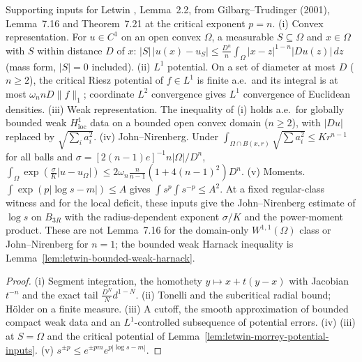 \begin{lemma}
  \label{lem:letwin-bounded-jn-inputs}
  \leanok
  Supporting inputs for Letwin \cite{Letwin2026QuadraticKLS}, Lemma~2.2, from Gilbarg--Trudinger (2001), Lemma~7.16 and
  Theorem~7.21 at the critical exponent $p=n$.
  (i) Convex representation. For $u\in C^1$ on an open convex $\Omega$, a measurable $S\subseteq\Omega$ and $x\in\Omega$ with $S$
  within distance $D$ of $x$: $|S|\,|u(x)-u_S|\le\frac{D^n}{n}\int_\Omega|x-z|^{1-n}|Du(z)|\,dz$ (mass form, $|S|=0$ included).
  (ii) $L^1$ potential. On a set of diameter at most $D$ ($n\ge2$), the critical Riesz potential of $f\in L^1$ is finite a.e.\
  and its integral is at most $\omega_nnD\|f\|_1$; coordinate $L^2$ convergence gives $L^1$ convergence of Euclidean densities.
  (iii) Weak representation. The inequality of (i) holds a.e.\ for globally bounded weak $H^1_{\mathrm{loc}}$ data on a bounded
  open convex domain ($n\ge2$), with $|Du|$ replaced by $\sqrt{\sum_i a_i^2}$.
  (iv) John--Nirenberg. Under $\int_{\Omega\cap B(x,r)}\sqrt{\sum a_i^2}\le Kr^{n-1}$ for all balls and
  $\sigma=[2(n-1)e]^{-1}n|\Omega|/D^n$, $\int_\Omega\exp(\frac{\sigma}{K}|u-u_\Omega|)\le2\omega_n\frac n{n-1}(1+4(n-1)^2)D^n$.
  (v) Moments. $\int\exp(p|\log s-m|)\le A$ gives $\int s^p\int s^{-p}\le A^2$.
  At a fixed regular-class witness and for the local deficit, these inputs give the John--Nirenberg estimate of $\log s$ on $B_{3R}$
  with the radius-dependent exponent $\sigma/K$ and the power-moment product. These are not Lemma~7.16 for the domain-only
  $W^{1,1}(\Omega)$ class or John--Nirenberg for $n=1$; the bounded weak Harnack inequality is Lemma~\ref{lem:letwin-bounded-weak-harnack}.
\end{lemma}
\begin{proof}
  \leanok
  (i) Segment integration, the homothety $y\mapsto x+t(y-x)$ with Jacobian $t^{-n}$ and the exact tail $\frac{D^N}{N}d^{1-N}$.
  (ii) Tonelli and the subcritical radial bound; H\"older on a finite measure. (iii) A cutoff, the smooth approximation of
  bounded compact weak data and an $L^1$-controlled subsequence of potential errors. (iv) (iii) at $S=\Omega$ and the critical
  potential of Lemma~\ref{lem:letwin-morrey-potential-inputs}. (v) $s^{\pm p}\le e^{\pm pm}e^{p|\log s-m|}$.
\end{proof}

